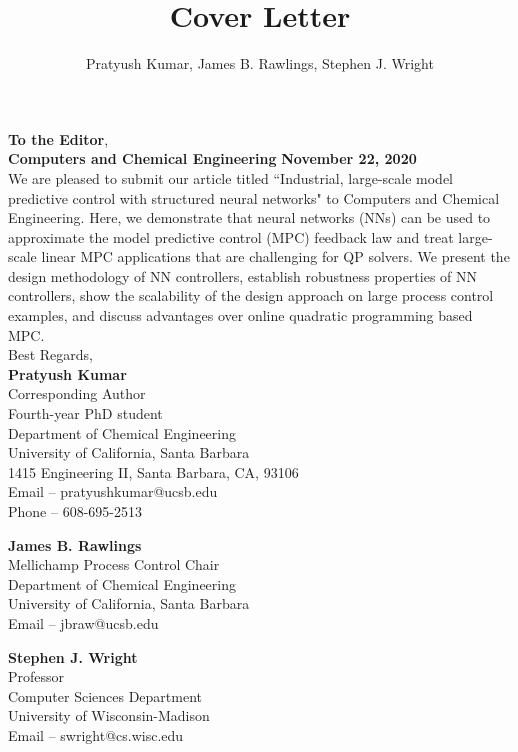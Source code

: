 \documentclass[xcolor=dvipsnames, 11pt]{article}
\title{Cover Letter}
\author{Pratyush Kumar, James B. Rawlings, Stephen J. Wright}
\begin{document}
\vspace{0.1in}
\noindent \textbf{To the Editor}, \\
\textbf{Computers and Chemical Engineering} \hfill \textbf{November 22, 2020} \\

\noindent We are pleased to submit our article titled ``Industrial, large-scale
model predictive control with structured neural networks" to Computers and
Chemical Engineering. Here, we demonstrate that neural networks (NNs) can be
used to approximate the model predictive control (MPC) feedback law and treat
large-scale linear MPC applications that are challenging for QP solvers. We
present the design methodology of NN controllers, establish robustness
properties of NN controllers, show the scalability of the design approach on
large process control examples, and discuss advantages over online quadratic
programming based MPC.  \\

\medskip
\noindent Best Regards, \\

\noindent \textbf{Pratyush Kumar} \\ 
Corresponding Author \\
Fourth-year PhD student \\
Department of Chemical Engineering \\
University of California, Santa Barbara \\ 
1415 Engineering II, Santa Barbara, CA, 93106 \\
Email -- pratyushkumar@ucsb.edu\\
Phone -- 608-695-2513 \\

\medskip

\noindent \textbf{James B. Rawlings} \\ 
Mellichamp Process Control Chair \\
Department of Chemical Engineering \\
University of California, Santa Barbara \\ 
Email -- jbraw@ucsb.edu \\

\medskip

\noindent \textbf{Stephen J. Wright} \\ 
Professor \\
Computer Sciences Department \\
University of Wisconsin-Madison \\ 
Email -- swright@cs.wisc.edu\\
\end{document}
